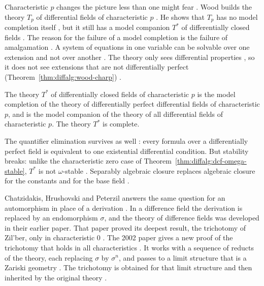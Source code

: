 Characteristic $p$ changes the picture less than one might fear
\cite[pp.~577--584]{Wood1973ModelTheory}. Wood builds the theory $T_p$
of differential fields of characteristic $p$
\cite[pp.~577--584]{Wood1973ModelTheory}. He shows that $T_p$ has no
model completion itself
\cite[p.~579]{Wood1973ModelTheory}, but it still has a model companion
$T^*$ of differentially closed fields \cite[p.~582]{Wood1973ModelTheory}.
The reason for the failure of a model completion is the failure of
amalgamation \cite[Theorem~2, p.~578]{Wood1973ModelTheory}. A system of
equations in one variable can be solvable over one extension and not over
another
\cite[pp.~579--580]{Wood1973ModelTheory}. The theory only sees
differential properties
\cite[pp.~579--580]{Wood1973ModelTheory}, so it does not see extensions
that are not differentially perfect (Theorem~\ref{thm:diffalg:wood-charp})
\cite[pp.~579--580]{Wood1973ModelTheory}.\begin{theorem}\label{thm:diffalg:wood-charp}
The theory $T^*$ of differentially closed fields of characteristic $p$
is the model completion of the theory of differentially perfect
differential fields of characteristic $p$, and is the model companion of
the theory of all differential fields of characteristic $p$. The theory
$T^*$ is complete.
\end{theorem}

The quantifier elimination survives as well
\cite[Theorem~11, p.~583]{Wood1973ModelTheory}: every formula over a
differentially perfect field is equivalent to one existential
differential condition. But stability breaks: unlike the characteristic
zero case of Theorem~\ref{thm:diffalg:dcf-omega-stable}, $T^*$ is not
$\omega$-stable \cite[p.~577]{Wood1973ModelTheory}. Separably algebraic
closure replaces algebraic closure for the constants and for the base
field \cite[Theorem~10, p.~582]{Wood1973ModelTheory}.

Chatzidakis, Hrushovski and Peterzil answers the same question for an
automorphism in place of a derivation
\cite[p.~257]{ChatzidakisHrushovskiPeterzil2002}. In a difference field the
derivation is replaced by an endomorphism $\sigma$, and the theory of
difference fields was developed in their earlier paper. That paper proved its
deepest result, the trichotomy of Zil'ber, only in characteristic $0$
\cite[p.~257]{ChatzidakisHrushovskiPeterzil2002}. The 2002 paper gives a new
proof of the trichotomy that holds in all characteristics
\cite[p.~257]{ChatzidakisHrushovskiPeterzil2002}. It works with a sequence of
reducts of the theory, each replacing $\sigma$ by $\sigma^{n}$, and passes to
a limit structure that is a Zariski geometry
\cite[p.~257]{ChatzidakisHrushovskiPeterzil2002}. The trichotomy is obtained
for that limit structure and then inherited by the original theory
\cite[p.~257]{ChatzidakisHrushovskiPeterzil2002}.

